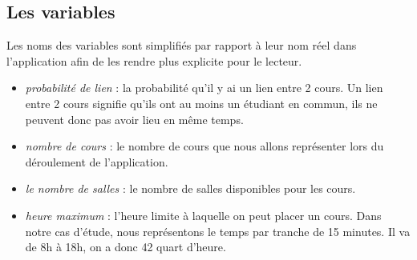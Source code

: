 \documentclass[a4paper,11pt]{article}
\begin{document}
	\subsection{Les variables}
		Les noms des variables sont simplifiés par rapport à leur nom réel dans l'application afin de les rendre plus explicite pour le lecteur.
		\begin{itemize}
			\item \textit{probabilité de lien} : la probabilité qu'il y ai un lien entre 2 cours. Un lien entre 2 cours signifie qu'ils ont au moins un étudiant en commun, ils ne peuvent donc pas avoir lieu en même temps.
			\item \textit{nombre de cours} : le nombre de cours que nous allons représenter lors du déroulement de l'application. 
			\item  \textit{le nombre de salles} : le nombre de salles disponibles pour les cours.
			\item \textit{heure maximum} : l'heure limite à laquelle on peut placer un cours. Dans notre cas d'étude, nous représentons le temps par tranche de 15 minutes. Il va de 8h à 18h, on a donc 42 quart d'heure.
		\end{itemize}
\end{document}
